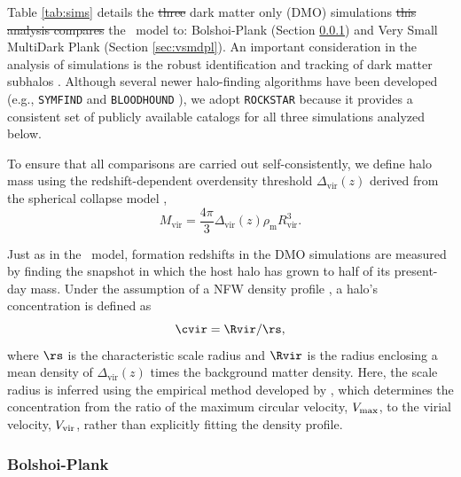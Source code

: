 

Table \ref{tab:sims} details the \sout{three}  dark matter only (DMO) simulations \sout{this analysis compares}  the \SatGen\ model to: Bolshoi-Plank (Section \ref{sec:bolshoi}) and Very Small MultiDark Plank (Section \ref{sec:vsmdpl}). An important consideration in the analysis of simulations is the robust identification and tracking of dark matter subhalos \citep{Knebe.etal.11, Onions.etal.12}. Although several newer halo-finding algorithms have been developed (e.g., \texttt{SYMFIND} \citep{Mansfield.etal.24} and \texttt{BLOODHOUND} \citep{Kong.etal.25}), we adopt \texttt{ROCKSTAR} \citep{Behroozi.etal.13a} because it provides a consistent set of publicly available catalogs for all three simulations analyzed below.

To ensure that all comparisons are carried out self-consistently, we define halo mass using the redshift-dependent overdensity threshold $\Delta_{\mathrm{vir}}(z)$ derived from the spherical collapse model \citep{Bryan.Norman.98},
%
\begin{equation}
    M_{\mathrm{vir}}=\frac{4 \pi}{3} \Delta_{\mathrm{vir}}(z) \rho_{\mathrm{m}} R_{\mathrm{vir}}^3.
    \label{eq:mvir}
\end{equation}
%

Just as in the \SatGen\ model, formation redshifts in the DMO simulations are measured by finding the snapshot in which the host halo has grown to half of its present-day mass. Under the assumption of a NFW density profile \citep{Navarro.etal.97}, a halo's concentration is defined as
%
\begin{equation}
    \cvir = \Rvir / \rs,
    \label{eq:rvir}
\end{equation}
%
where $\rs$ is the characteristic scale radius and $\Rvir$ is the radius enclosing a mean density of $\Delta_{\mathrm{vir}}(z)$ times the background matter density. Here, the scale radius is inferred using the empirical method developed by \cite{Klypin.etal.11, Prada.etal.12}, which determines the concentration from the ratio of the maximum circular velocity, $V_{\rm max}$, to the virial velocity, $V_{\rm vir}$, rather than explicitly fitting the density profile.


\subsubsection{Bolshoi-Plank}
\label{sec:bolshoi}

